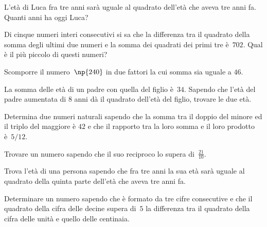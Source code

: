 \begin{multicols}{2}
\begin{esercizio}[\Ast] %
 \label{ese:3.131}
L'età di Luca fra tre anni sarà uguale al quadrato dell'età che aveva tre anni fa. Quanti anni ha oggi Luca?
\end{esercizio}

\begin{esercizio}[\Ast]
 \label{ese:3.132}
Di cinque numeri interi consecutivi si sa che la differenza tra il quadrato
della somma degli ultimi due numeri e la somma dei quadrati dei primi tre è~$ 702 $. Qual è il più piccolo di questi numeri?
\end{esercizio}

\begin{esercizio}[\Ast] %
 \label{ese:3.133}
Scomporre il numero~$\np{240}$ in due fattori la cui somma sia uguale a $46$.
\end{esercizio}

 \begin{esercizio}[\Ast]
 \label{ese:3.134}
La somma delle età di un padre con quella del figlio è~$ 34 $. Sapendo che
l'età del padre aumentata di $ 8 $ anni dà il quadrato dell'età del figlio,
trovare le due età.
\end{esercizio}

\begin{esercizio}[\Ast]
 \label{ese:3.135}
Determina due numeri naturali sapendo che la somma tra il doppio del minore
ed il triplo del maggiore è $ 42 $ e che il rapporto tra la loro somma e il loro
prodotto è~$ 5/12 $.
\end{esercizio}

\begin{esercizio}[\Ast] %
 \label{ese:3.136}
Trovare un numero sapendo che il suo reciproco lo supera di~$\frac{21}{10}$.
\end{esercizio}

\begin{esercizio}[\Ast]
 \label{ese:3.137}
Trova l'età di una persona sapendo che fra tre anni la sua età sarà
uguale al quadrato della quinta parte dell'età che aveva tre anni fa.
\end{esercizio}

\begin{esercizio}[\Ast] %
 \label{ese:3.138}
Determinare un numero sapendo che è formato da tre cifre consecutive e
che il quadrato della cifra delle decine supera di~$5$ la differenza
tra il quadrato della cifra delle unità e quello delle centinaia.
\end{esercizio}


\end{multicols}
